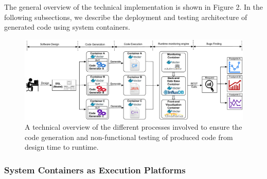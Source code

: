 The general overview of the technical implementation is shown in Figure 2. In the following subsections, we describe the deployment and testing architecture of generated code using system containers.


\begin{figure}[!h]
	\center
	\includegraphics[width=0.95\linewidth]{Ressources/background2.pdf}
	\caption{A technical overview of the different processes involved to ensure the code generation and non-functional testing of produced code from design time to runtime.}
\end{figure}


\subsubsection{System Containers as Execution Platforms}





